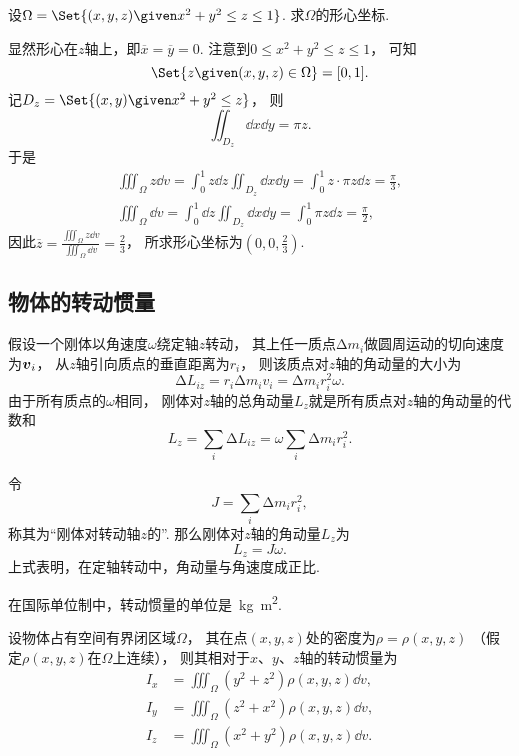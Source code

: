 \begin{example}
设\(\Omega = \Set{ (x,y,z) \given x^2+y^2 \leq z \leq 1 }\).
求\(\Omega\)的形心坐标.
\begin{solution}
显然形心在\(z\)轴上，即\(\overline{x} = \overline{y} = 0\).
注意到\(0 \leq x^2+y^2 \leq z \leq 1\)，
可知\[
	\Set{ z \given (x,y,z) \in \Omega } = [0,1].
\]
记\(D_z = \Set{ (x,y) \given x^2+y^2 \leq z}\)，
则\[
	\iint_{D_z} \dd{x}\dd{y} = \pi z.
\]
于是\begin{gather*}
	\iiint_\Omega z \dd{v}
	= \int_0^1 z \dd{z} \iint_{D_z} \dd{x}\dd{y}
	= \int_0^1 z \cdot \pi z \dd{z}
	= \frac\pi3, \\
	\iiint_\Omega \dd{v}
	= \int_0^1 \dd{z} \iint_{D_z} \dd{x} \dd{y}
	= \int_0^1 \pi z \dd{z}
	= \frac\pi2,
\end{gather*}
因此\(\overline{z}
= \frac{\iiint_\Omega z \dd{v}}{\iiint_\Omega \dd{v}}
= \frac23\)，
所求形心坐标为\(\left( 0,0,\frac23 \right)\).
\end{solution}
\end{example}

\subsection{物体的转动惯量}
假设一个刚体以角速度\(\omega\)绕定轴\(z\)转动，
其上任一质点\(\increment m_i\)做圆周运动的切向速度为\(\boldsymbol{v}_i\)，
从\(z\)轴引向质点的垂直距离为\(r_i\)，
则该质点对\(z\)轴的角动量的大小为\[
	\increment L_{iz}
	= r_i \increment m_i v_i
	= \increment m_i r_i^2 \omega.
\]
由于所有质点的\(\omega\)相同，
刚体对\(z\)轴的总角动量\(L_z\)就是所有质点对\(z\)轴的角动量的代数和\[
	L_z = \sum_i \increment L_{iz}
	= \omega \sum_i \increment m_i r_i^2.
\]

令\[
	J = \sum_i \increment m_i r_i^2,
\]
称其为“刚体对转动轴\(z\)的”.
那么刚体对\(z\)轴的角动量\(L_z\)为\[
	L_z = J \omega.
\]
上式表明，在定轴转动中，角动量与角速度成正比.

在国际单位制中，转动惯量的单位是~\unit{\kilo\gram.\square\meter}.

\begin{theorem}
设物体占有空间有界闭区域\(\Omega\)，
其在点\((x,y,z)\)处的密度为\(\rho=\rho(x,y,z)\)
（假定\(\rho(x,y,z)\)在\(\Omega\)上连续），
则其相对于\(x\)、\(y\)、\(z\)轴的转动惯量为\begin{align}
	I_x &= \iiint_\Omega (y^2+z^2) \rho(x,y,z) \dd{v}, \\
	I_y &= \iiint_\Omega (z^2+x^2) \rho(x,y,z) \dd{v}, \\
	I_z &= \iiint_\Omega (x^2+y^2) \rho(x,y,z) \dd{v}.
\end{align}
\end{theorem}

